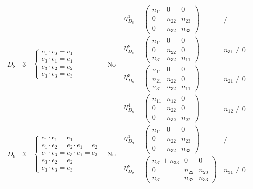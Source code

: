 \documentclass[12pt, reqno]{amsart}
\theoremstyle{plain}
\begin{document}
\begin{table}[H]
\begin{tabular}{|c|c|l|c|l|l|}
    \hline
    \multirow{4}{*}{$D_8$} & \multirow{4}{*}{3} & \multirow{4}{*}{$\begin{cases} e_1 \cdot e_3 = e_1 \\ e_3 \cdot e_1 = e_1 \\ e_3 \cdot e_2 = e_2 \\ e_3 \cdot e_3 = e_3 \end{cases}$} & \multirow{4}{*}{No} & 
    $N_{D_8}^1 = \begin{pmatrix} n_{11} & 0 & 0 \\ 0 & n_{22} & n_{23} \\ 0 & n_{32} & n_{33} \end{pmatrix}$ & $/$ \\
    & & & & $N_{D_8}^2 = \begin{pmatrix} n_{11} & 0 & 0 \\ 0 & n_{22} & 0 \\ n_{31} & n_{32} & n_{11} \end{pmatrix}$ & $n_{31} \neq 0$ \\
    & & & & $N_{D_8}^3 = \begin{pmatrix} n_{11} & 0 & 0 \\ n_{21} & n_{22} & 0 \\ n_{31} & n_{32} & n_{11} \end{pmatrix}$ & $n_{21} \neq 0$ \\
    & & & & $N_{D_8}^4 = \begin{pmatrix} n_{11} & n_{12} & 0 \\ 0 & n_{22} & 0 \\ 0 & n_{32} & n_{22} \end{pmatrix}$ & $n_{12} \neq 0$ \\
    \hline
    \multirow{5}{*}{$D_9$} & \multirow{5}{*}{3} & \multirow{5}{*}{$\begin{cases} e_1 \cdot e_1 = e_1 \\ e_1 \cdot e_2 = e_2 \cdot e_1 = e_2 \\ e_1 \cdot e_3 = e_3 \cdot e_1 = e_3 \\ e_3 \cdot e_2 = e_2 \\ e_3 \cdot e_3 = e_3 \end{cases}$} & \multirow{5}{*}{No} & 
    $N_{D_9}^1 = \begin{pmatrix} n_{11} & 0 & 0 \\ 0 & n_{22} & n_{23} \\ 0 & n_{32} & n_{33} \end{pmatrix}$ & $/$ \\
    & & & & $N_{D_9}^2 = \begin{pmatrix} n_{31}+n_{33} & 0 & 0 \\ 0 & n_{22} & n_{23} \\ n_{31} & n_{32} & n_{33} \end{pmatrix}$ & $n_{31} \neq 0$ \\

\end{tabular}
\end{table}
\end{document}

